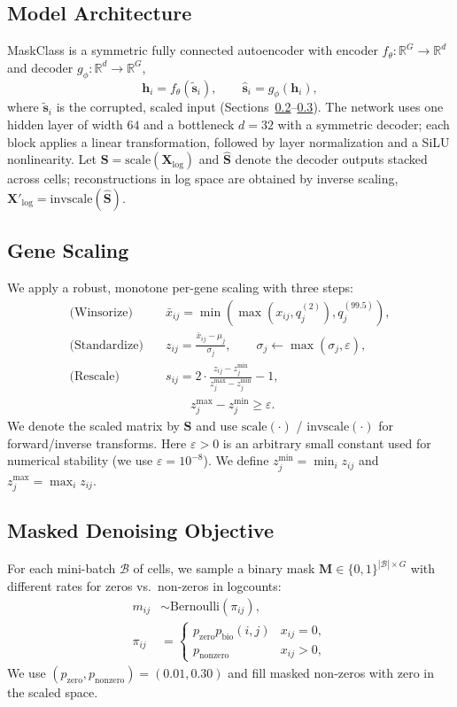 \documentclass{article}
\theoremstyle{plain}
\theoremstyle{definition}
\theoremstyle{remark}
\begin{document}
\subsection{Model Architecture}
MaskClass is a symmetric fully connected autoencoder with encoder
$f_\theta:\mathbb{R}^{G}\!\to\!\mathbb{R}^{d}$ and decoder
$g_\phi:\mathbb{R}^{d}\!\to\!\mathbb{R}^{G}$,
\[
\mathbf{h}_i=f_\theta(\tilde{\mathbf{s}}_i),\qquad
\hat{\mathbf{s}}_i=g_\phi(\mathbf{h}_i),
\]
where $\tilde{\mathbf{s}}_i$ is the corrupted, scaled input
(Sections~\ref{sec:scaling}--\ref{sec:masking}). The network uses one hidden
layer of width $64$ and a bottleneck $d{=}32$ with a symmetric decoder; each
block applies a linear transformation, followed by layer normalization and a
SiLU nonlinearity.
Let $\mathbf{S}=\mathrm{scale}(\mathbf{X}_{\log})$ and $\hat{\mathbf{S}}$ denote
the decoder outputs stacked across cells; reconstructions in log space are
obtained by inverse scaling, $\mathbf{X}'_{\log}=\mathrm{invscale}(\hat{\mathbf{S}})$.

\subsection{Gene Scaling}
\label{sec:scaling}
We apply a robust, monotone per-gene scaling with three steps:
\[
\begin{aligned}
\text{(Winsorize)}\quad &\bar{x}_{ij}=\min(\max(x_{ij},q^{(2)}_j),q^{(99.5)}_j),\\
\text{(Standardize)}\quad &z_{ij}=\frac{\bar{x}_{ij}-\mu_j}{\sigma_j},\qquad
\sigma_j\leftarrow\max(\sigma_j,\varepsilon),\\
\text{(Rescale)}\quad &s_{ij}=2\cdot\frac{z_{ij}-z^{\min}_j}{z^{\max}_j-z^{\min}_j}-1,\\
&\qquad z^{\max}_j-z^{\min}_j\ge\varepsilon.
\end{aligned}
\]
We denote the scaled matrix by $\mathbf{S}$ and use
$\mathrm{scale}(\cdot)$ / $\mathrm{invscale}(\cdot)$ for forward/inverse
transforms.
Here $\varepsilon>0$ is an arbitrary small constant used for numerical
stability (we use $\varepsilon=10^{-8}$).
We define $z^{\min}_j=\min_i z_{ij}$ and $z^{\max}_j=\max_i z_{ij}$.

\subsection{Masked Denoising Objective}
\label{sec:masking}
For each mini-batch $\mathcal{B}$ of cells, we sample a binary mask
$\mathbf{M}\!\in\!\{0,1\}^{|\mathcal{B}|\times G}$ with different rates for
zeros vs.\ non‑zeros in logcounts:
\[
\begin{aligned}
m_{ij}&\sim\mathrm{Bernoulli}(\pi_{ij}),\\
\pi_{ij}&=\begin{cases}
p_{\mathrm{zero}}p_{\mathrm{bio}}(i,j) & x_{ij}=0,\\
p_{\mathrm{nonzero}} & x_{ij}>0,
\end{cases}
\end{aligned}
\]
We use $(p_{\mathrm{zero}},p_{\mathrm{nonzero}})=(0.01,0.30)$ and fill masked
non‑zeros with zero in the scaled space.
\end{document}
